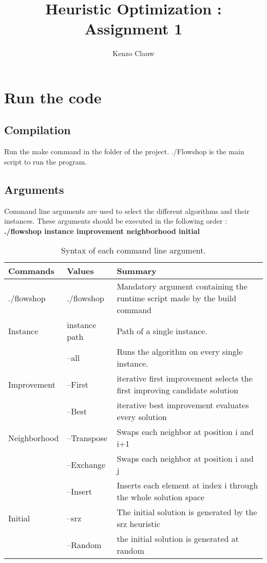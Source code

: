 \documentclass[]{article}
\title{Heuristic Optimization : Assignment 1}
\author{Kenzo Clauw}
\begin{document}
	
	\maketitle
	
	\begin{abstract}
		
	\end{abstract}
	
	\section{Run the code}
	\subsection{Compilation}
	Run the make command in the folder of the project.
	./Flowshop is the main script to run the program.
	
	\subsection{Arguments}
	Command line arguments are used to select the different algorithms and their instances.
	These arguments should be executed in the following order :\newline\newline
	\textbf{./flowshop instance improvement neighborhood initial}
	
	
	
	\begin{table}[h!]
		\caption{Syntax of each command line argument.}
		\label{tab:Syntax table}
		\begin{tabular}{ | l | l | p{10cm} |}
			\hline
			Commands & Values & Summary \\ \hline
			
			./flowshop & ./flowshop & Mandatory argument containing the runtime script made by the build command\\ \hline
			
			Instance& instance path & Path of a single instance. \\ 
			& --all & Runs the algorithm on every single instance.\\ \hline
			
			Improvement & --First & iterative first improvement selects the first improving candidate solution \\
			& --Best & iterative best improvement evaluates every solution\\
			\hline
			
			Neighborhood & --Transpose & Swaps each neighbor at position i and i+1 \\
			& --Exchange & Swaps each neighbor at position i and j\\
			& --Insert & Inserts each element at index i through the whole solution space \\
			\hline
			
			Initial & --srz & The initial solution is generated by the srz heuristic\\
			& --Random & the initial solution is generated at random\\
			\hline
		\end{tabular}
	\end{table}
	
\end{document}

